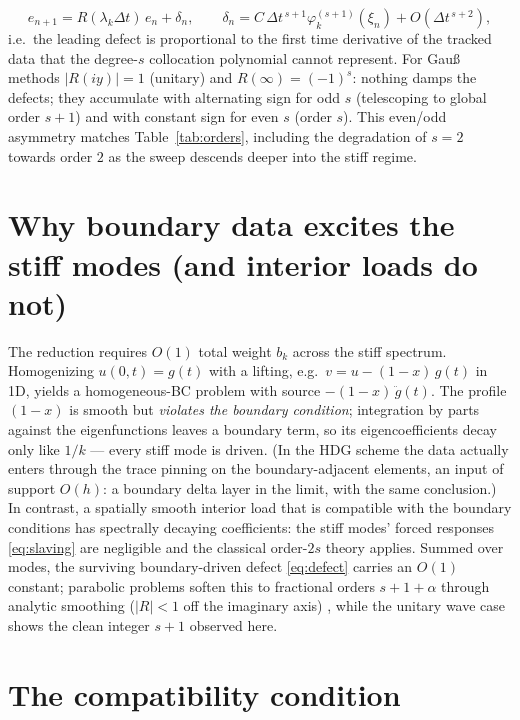 \documentclass[11pt,a4paper]{article}
\newcommand{\dt}{\Delta t}
\begin{document}
\cite{hw2}
\begin{equation}
  e_{n+1} = R(\lambda_k\dt)\, e_n + \delta_n, \qquad
  \delta_n = C\,\dt^{\,s+1}\varphi_k^{(s+1)}(\xi_n) + O(\dt^{\,s+2}),
  \label{eq:defect}
\end{equation}
i.e.\ the leading defect is proportional to the first time derivative of the
tracked data that the degree-$s$ collocation polynomial cannot represent. For
Gau{\ss} methods $|R(iy)| = 1$ (unitary) and $R(\infty) = (-1)^s$: nothing damps
the defects; they accumulate with alternating sign for odd $s$ (telescoping to
global order $s{+}1$) and with constant sign for even $s$ (order $s$). This
even/odd asymmetry matches Table~\ref{tab:orders}, including the degradation of
$s = 2$ towards order $2$ as the sweep descends deeper into the stiff regime.

\section{Why boundary data excites the stiff modes (and interior loads do not)}

The reduction requires $O(1)$ total weight $b_k$ across the stiff spectrum.
Homogenizing $u(0,t) = g(t)$ with a lifting, e.g.\ $v = u - (1-x)\,g(t)$ in 1D,
yields a homogeneous-BC problem with source $-(1-x)\,\ddot g(t)$. The profile
$(1-x)$ is smooth but \emph{violates the boundary condition}; integration by
parts against the eigenfunctions leaves a boundary term, so its eigencoefficients
decay only like $1/k$ --- every stiff mode is driven. (In the HDG scheme the
data actually enters through the trace pinning on the boundary-adjacent elements,
an input of support $O(h)$: a boundary delta layer in the limit, with the same
conclusion.) In contrast, a spatially smooth interior load that is compatible
with the boundary conditions has spectrally decaying coefficients: the stiff
modes' forced responses \eqref{eq:slaving} are negligible and the classical
order-$2s$ theory applies. Summed over modes, the surviving boundary-driven
defect \eqref{eq:defect} carries an $O(1)$ constant; parabolic problems soften
this to fractional orders $s{+}1{+}\alpha$ through analytic smoothing
($|R| < 1$ off the imaginary axis) \cite{or}, while the unitary wave case shows
the clean integer $s{+}1$ observed here.

\section{The compatibility condition}
\end{document}
